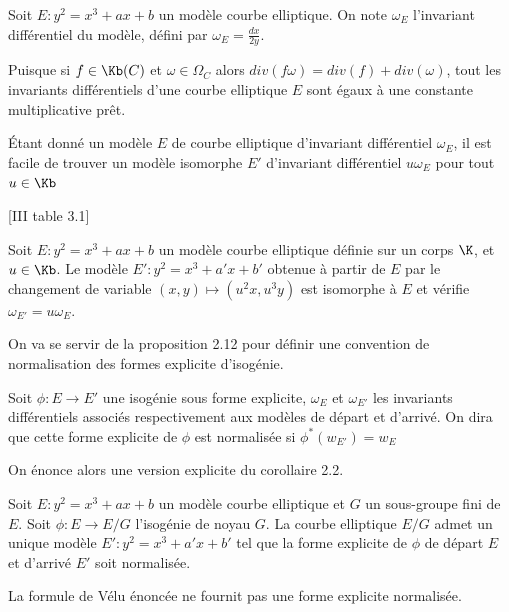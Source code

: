 \begin{Def}
	Soit $E : y^2 = x^3 + ax + b$ un modèle courbe elliptique. On note $\omega_{E}$ l'invariant différentiel du modèle, défini par $\omega_{E} = \frac{dx}{2y}$. 
\end{Def}

\begin{Rem}
	Puisque si $f\in\Kb(C)$ et $\omega\in\Omega_{C}$ alors $div(f\omega) = div(f) + div(\omega)$, tout les invariants différentiels d'une courbe elliptique $E$ sont égaux à une constante multiplicative prêt.
\end{Rem}

Étant donné un modèle $E$ de courbe elliptique d'invariant différentiel $\omega_{E}$, il est facile de trouver un modèle isomorphe $E'$ d'invariant différentiel $u\omega_{E}$ pour tout $u\in\Kb$

\begin{Prop}\cite{Sil09}[III table 3.1]
	
	Soit $E : y^2 = x^3 + ax + b$ un modèle courbe elliptique définie sur un corps $\K$, et $u\in\Kb$. Le modèle $E' : y^2 = x^3 + a'x + b'$ obtenue à partir de $E$ par le changement de variable $(x,y)\mapsto(u^{2}x,u^{3}y)$ est isomorphe à $E$ et vérifie $\omega_{E'} = u\omega_{E}$.
\end{Prop}

On va se servir de la proposition 2.12 pour définir une convention de normalisation des formes explicite d'isogénie.

\begin{Def}
	Soit $\phi : E\rightarrow E'$ une isogénie sous forme explicite, $\omega_{E}$ et $\omega_{E'}$ les invariants différentiels associés respectivement aux modèles de départ et d'arrivé. On dira que cette forme explicite de $\phi$ est normalisée si $\phi^{*}(w_{E'}) = w_E$
	
\end{Def}

On énonce alors une version explicite du corollaire 2.2.

\begin{Prop}
	Soit $E : y^2 = x^3 + ax + b$ un modèle courbe elliptique et $G$ un sous-groupe fini de $E$. Soit $\phi : E\rightarrow E/G$ l'isogénie de noyau $G$. La courbe elliptique $E/G$ admet un unique modèle $E' : y^2 = x^3 + a'x + b'$ tel que la forme explicite de $\phi$ de départ $E$ et d'arrivé $E'$ soit normalisée. 
\end{Prop}

\begin{Rem}
	La formule de Vélu énoncée ne fournit pas une forme explicite normalisée.
\end{Rem}


